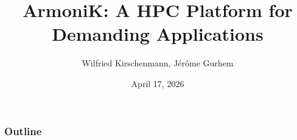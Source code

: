 \documentclass[11pt,aspectratio=1609]{beamer}
\begin{document}
\author{Wilfried Kirschenmann, Jérôme Gurhem}
\title{ArmoniK: A HPC Platform for Demanding Applications}
\date{April 17, 2026}

\titlepage

\AtBeginSection[]
{
	\frame{\sectionpage}
}

\begin{frame}
	\frametitle{Outline}
	\tableofcontents
\end{frame}







\closingpage
\end{document}
